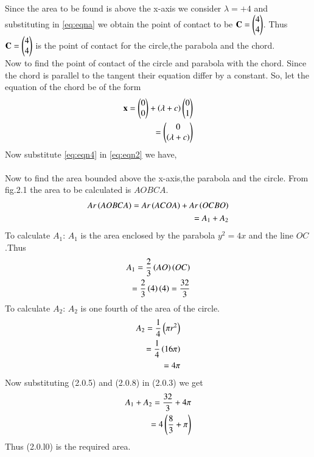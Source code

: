 \documentclass[journal,12pt,twocolumn]{IEEEtran}
\begin{document}
Since the area to be found is above the x-axis we consider $\lambda = +4$ and substituting in \eqref{eq:eqna} we obtain the point of contact to be
$\mathbf{C}=\begin{pmatrix}4 \\ 4\end{pmatrix}$.
Thus $\mathbf{C}=\begin{pmatrix}4 \\ 4\end{pmatrix}$ is the point of contact for the circle,the parabola and the chord.
\\
Now to find the point of contact of the circle and parabola with the chord.
Since the chord is parallel to the tangent their equation differ by a constant.
So, let the equation of the chord be of the form 
\begin{align}
  \mathbf{x}=\begin{pmatrix}0 \\ 0\end{pmatrix}+\left(\lambda +c\right)\begin{pmatrix}0 \\ 1\end{pmatrix}  
  \\
  = \begin{pmatrix}0 \\ \left(\lambda + c\right)\end{pmatrix}\label{eq:eqn4}
\end{align}
Now substitute \eqref{eq:eqn4} in \eqref{eq:eqn2} we have,
\\
\\
Now to find the area bounded above the x-axis,the parabola and the circle.
From fig.2.1 the area to be calculated is $AOBCA$.
\begin{align}
Ar\left(AOBCA\right) = Ar\left(ACOA\right) + Ar\left(OCBO\right)
\\
= A_{1} + A_{2}
\end{align}
To calculate $A_{1}$:
$A_{1}$ is the area enclosed by the parabola $y^2=4x$ and the line $OC$.Thus
\begin{align}
    A_{1} = \frac{2}{3}\left(AO\right)\left(OC\right)
    \\
    = \frac{2}{3}\left(4\right)\left(4\right) = \frac{32}{3}
\end{align}
To calculate $A_{2}$: $A_{2}$ is one fourth of the area of the circle.
\begin{align}
    A_{2} = \frac{1}{4}\left(\pi r^2\right)
    \\
    = \frac{1}{4}\left(16\pi\right)
    \\
    = 4\pi
\end{align}
Now substituting (2.0.5) and (2.0.8) in (2.0.3) we get
\begin{align}
    A_{1} + A_{2} = \frac{32}{3} + 4\pi
    \\
    = 4\left(\frac{8}{3} + \pi\right) 
\end{align}
Thus (2.0.l0) is the required area.

\end{document}
